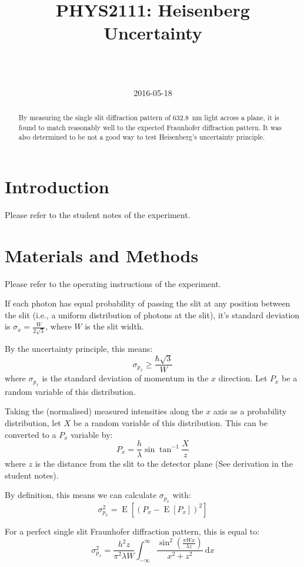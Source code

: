 \documentclass[a4paper]{scrartcl}
\begin{document}
\title{PHYS2111: Heisenberg Uncertainty}
\author{ \\ \\ }
\date{2016-05-18}
\maketitle

\begin{abstract}
    By measuring the single slit diffraction pattern of \SI{632.8}{\nano\metre} light across a plane, it is found to match reasonably well to the expected Fraunhofer diffraction pattern. It was also determined to be not a good way to test Heisenberg's uncertainty principle.
\end{abstract}

\section{Introduction}
Please refer to the student notes of the experiment.

\section{Materials and Methods}
Please refer to the operating instructions of the experiment.

If each photon has equal probability of passing the slit at any position between the slit (i.e., a uniform distribution of photons at the slit), it's standard deviation is \(\sigma_x = \frac{W}{2 \sqrt{3}}\), where \(W\) is the slit width.

By the uncertainty principle, this means:
\[\sigma_{p_x} \ge \frac{\hbar \sqrt{3}}{W}\]
where \(\sigma_{p_x}\) is the standard deviation of momentum in the \(x\) direction. Let \(P_x\) be a random variable of this distribution.

Taking the (normalised) measured intensities along the \(x\) axis as a probability distribution, let \(X\) be a random variable of this distribution. This can be converted to a \(P_x\) variable by:
\[P_x = \frac{h}{\lambda} \sin \tan^{-1} \frac{X}{z}\]
where \(z\) is the distance from the slit to the detector plane (See derivation in the student notes).

By definition, this means we can calculate \(\sigma_{p_x}\) with:
\[\sigma_{p_x}^2 = \operatorname{E}[(P_x - \operatorname{E}[P_x])^2]\]

For a perfect single slit Fraunhofer diffraction pattern, this is equal to:
\[\sigma_{p_x}^2 = \frac{h^2 z}{\pi^2 \lambda W} \int_{-\infty}^{\infty} \frac{\sin^2 \left(\frac{\pi W x}{\lambda z}\right)}{x^2 + z^2} \:\mathrm{d}x\]
\end{document}
